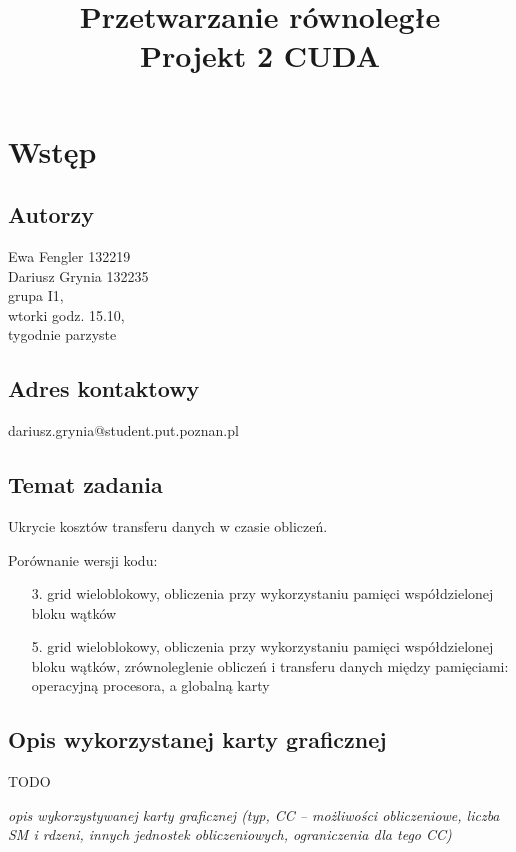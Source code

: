 \documentclass[12pt,a4paper]{article}
\date{}
\title{Przetwarzanie równoległe \\ \Large Projekt 2 CUDA}
\begin{document}
\maketitle
\thispagestyle{empty}

\vspace{-2cm} %
\section{Wstęp}

\subsection{Autorzy}
Ewa Fengler 132219\\
Dariusz Grynia 132235\\
grupa I1,\\
wtorki godz. 15.10,\\
tygodnie parzyste\\

\subsection{Adres kontaktowy}
dariusz.grynia@student.put.poznan.pl

\subsection{Temat zadania}
Ukrycie kosztów transferu danych w czasie obliczeń.

Porównanie wersji kodu:
\begin{itemize}
\item [3.] grid wieloblokowy, obliczenia przy wykorzystaniu pamięci współdzielonej bloku wątków
\item [5.] grid wieloblokowy, obliczenia przy wykorzystaniu pamięci współdzielonej bloku wątków, zrównoleglenie obliczeń i transferu danych między pamięciami: operacyjną procesora, a globalną karty
\end{itemize}

\subsection{Opis wykorzystanej karty graficznej}

TODO

\textit{opis wykorzystywanej karty graficznej (typ, CC – możliwości obliczeniowe, liczba SM i rdzeni, innych
jednostek obliczeniowych, ograniczenia dla tego CC)}
\end{document}
